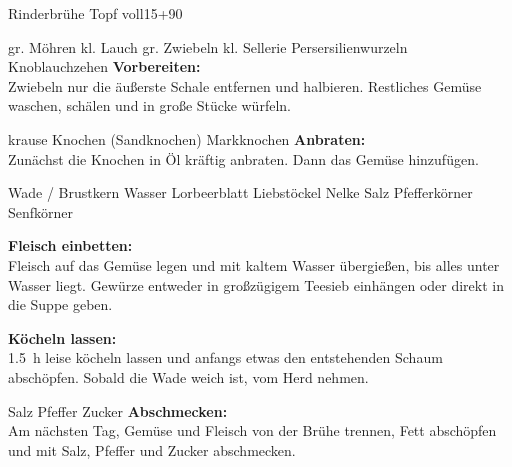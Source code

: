 \begin{MyRecipe}{Rinderbrühe}{ Topf voll}{\SI{15}{\minuteprime}+\SI{90}{\minuteprime}}

\ingredient[\Calc{2}{\x}]{} {gr. Möhren}
\ingredient[\Calc{1}{\x}]{} {kl. Lauch}
\ingredient[\Calc{2}{\x}]{} {gr. Zwiebeln}
\ingredient[\Calc{1}{\x}]{} {kl. Sellerie}
\ingredient[\Calc{2}{\x}]{} {Persersilienwurzeln}
\ingredient[\Calc{2}{\x}]{} {Knoblauchzehen}
\textbf{Vorbereiten:}\\
Zwiebeln nur die äußerste Schale entfernen und halbieren. Restliches Gemüse waschen, schälen und in große Stücke würfeln.

 {krause Knochen (Sandknochen)}
 {Markknochen}
\textbf{Anbraten:}\\
Zunächst die Knochen in Öl kräftig anbraten. Dann das Gemüse hinzufügen.

 {Wade / Brustkern}
 {Wasser}
\ingredient[\Calc{1}{\x}]{} {Lorbeerblatt}
 {Liebstöckel}
\ingredient[\Calc{1}{\x}]{} {Nelke}
 {Salz}
 {Pfefferkörner}
 {Senfkörner}

\textbf{Fleisch einbetten:}\\
Fleisch auf das Gemüse legen und mit kaltem Wasser übergießen, bis alles unter Wasser liegt. Gewürze entweder in großzügigem Teesieb einhängen oder direkt in die Suppe geben.

\textbf{Köcheln lassen:}\\
\SI{1,5}{\hour} leise köcheln lassen und anfangs etwas den entstehenden Schaum abschöpfen. Sobald die Wade weich ist, vom Herd nehmen.\par

\ingredient[]{} {Salz}
\ingredient[]{} {Pfeffer}
\ingredient[]{} {Zucker}
\textbf{Abschmecken:}\\
Am nächsten Tag, Gemüse und Fleisch von der Brühe trennen, Fett abschöpfen und mit Salz, Pfeffer und Zucker abschmecken.









\end{MyRecipe}
